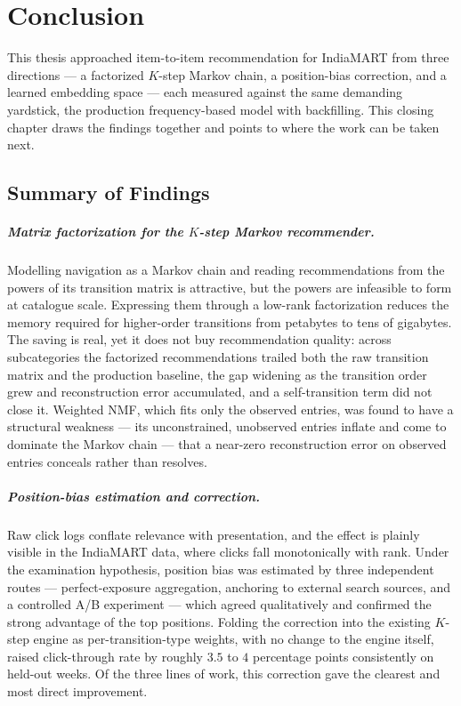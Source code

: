 \chapter{Conclusion}
\label{ch:conclusion}

This thesis approached item-to-item recommendation for IndiaMART from three
directions --- a factorized $K$-step Markov chain, a position-bias correction,
and a learned embedding space --- each measured against the same demanding
yardstick, the production frequency-based model with backfilling. This closing
chapter draws the findings together and points to where the work can be taken
next.

\section{Summary of Findings}
\label{sec:concl-summary}

\paragraph{Matrix factorization for the $K$-step Markov recommender.}
Modelling navigation as a Markov chain and reading recommendations from the
powers of its transition matrix is attractive, but the powers are infeasible to
form at catalogue scale. Expressing them through a low-rank factorization reduces
the memory required for higher-order transitions from petabytes to tens of
gigabytes. The saving is real, yet it does not buy recommendation quality:
across subcategories the factorized recommendations trailed both the raw
transition matrix and the production baseline, the gap widening as the transition
order grew and reconstruction error accumulated, and a self-transition term did
not close it. Weighted NMF, which fits only the observed entries, was found to
have a structural weakness --- its unconstrained, unobserved entries inflate and
come to dominate the Markov chain --- that a near-zero reconstruction error on
observed entries conceals rather than resolves.

\paragraph{Position-bias estimation and correction.}
Raw click logs conflate relevance with presentation, and the effect is plainly
visible in the IndiaMART data, where clicks fall monotonically with rank. Under
the examination hypothesis, position bias was estimated by three independent
routes --- perfect-exposure aggregation, anchoring to external search sources,
and a controlled A/B experiment --- which agreed qualitatively and confirmed the
strong advantage of the top positions. Folding the correction into the existing
$K$-step engine as per-transition-type weights, with no change to the engine
itself, raised click-through rate by roughly $3.5$ to $4$ percentage points
consistently on held-out weeks. Of the three lines of work, this correction gave
the clearest and most direct improvement.

